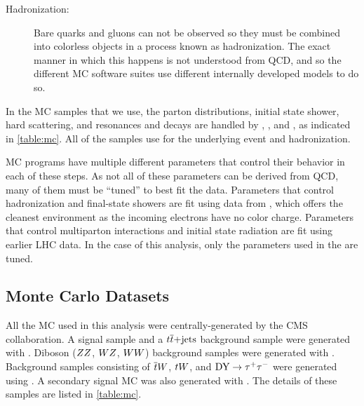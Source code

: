 \begin{description}
    \item[Hadronization:] Bare quarks and gluons can not be observed so they
        must be combined into colorless objects in a process known as
        hadronization. The exact manner in which this happens is not understood
        from QCD, and so the different MC software suites use different
        internally developed models to do so.


\end{description}

In the MC samples that we use, the parton distributions, initial state shower,
hard scattering, and resonances and decays are handled by \MADGRAPH
{} \cite{alwall2014}, \POWHEG
\cite{nason2004,alioli2010,re2011}, and \PYTHIAsix {}
\cite{sjostran2006}, as indicated in \cref{table:mc}. All of the samples use
\PYTHIAsix for the underlying event and hadronization.

MC programs have multiple different parameters that control their behavior in
each of these steps. As not all of these parameters can be derived from QCD,
many of them must be ``tuned'' to best fit the data. Parameters that control
hadronization and final-state showers are fit using data from \LEP, which
offers the cleanest environment as the incoming electrons have no color charge.
Parameters that control multiparton interactions and initial state radiation
are fit using earlier LHC data. In the case of this analysis, only the
parameters used in the \PYTHIAsix are tuned.

\subsection{Monte Carlo Datasets}
\label{ssec:monte_carlo}

All the MC used in this analysis were centrally-generated by the CMS
collaboration. A \DYtoll signal sample and a $t \overline{t}\text{+jets}$ background
sample were generated with \MADGRAPH. Diboson ($ZZ$, $WZ$, $WW$)
background samples were generated with \PYTHIAsix . Background samples
consisting of $\overline{t} W$, $t W$, and $\text{DY} \to \tau^{+} \tau^{-}$ were generated using
\POWHEG . A secondary signal MC was also generated with \POWHEG. The details of
these samples are listed in \cref{table:mc}.

